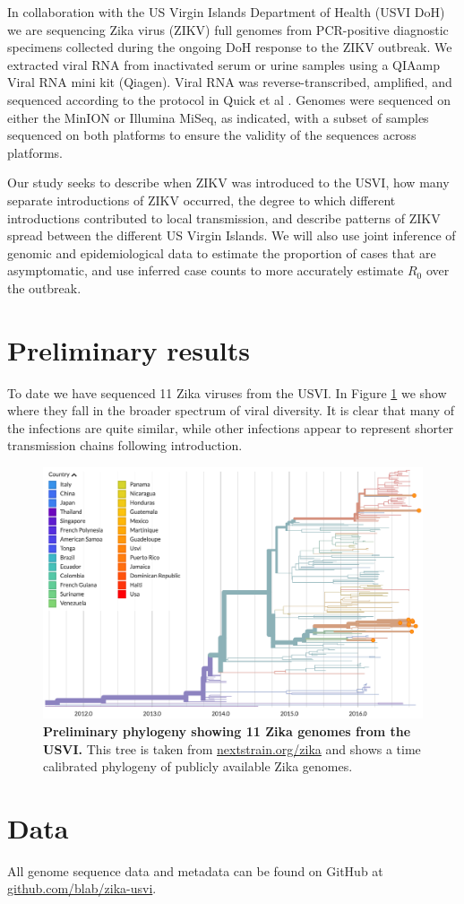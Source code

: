 \documentclass[11pt,oneside,letterpaper]{article}
\begin{document}
In collaboration with the US Virgin Islands Department of Health (USVI DoH) we are sequencing Zika virus (ZIKV) full genomes from PCR-positive diagnostic specimens collected during the ongoing DoH response to the ZIKV outbreak.
We extracted viral RNA from inactivated serum or urine samples using a QIAamp Viral RNA mini kit (Qiagen).
Viral RNA was reverse-transcribed, amplified, and sequenced according to the protocol in Quick et al \cite{quick2017multiplex}.
Genomes were sequenced on either the MinION or Illumina MiSeq, as indicated, with a subset of samples sequenced on both platforms to ensure the validity of the sequences across platforms.

Our study seeks to describe when ZIKV was introduced to the USVI, how many separate introductions of ZIKV occurred, the degree to which different introductions contributed to local transmission, and describe patterns of ZIKV spread between the different US Virgin Islands.
We will also use joint inference of genomic and epidemiological data to estimate the proportion of cases that are asymptomatic, and use inferred case counts to more accurately estimate $R_0$ over the outbreak.

\section*{Preliminary results}

To date we have sequenced 11 Zika viruses from the USVI. In Figure \ref{zika_usvi_tree} we show where they fall in the broader spectrum of viral diversity.
It is clear that many of the infections are quite similar, while other infections appear to represent shorter transmission chains following introduction.

\begin{figure}[H]
	\centering
	\includegraphics[width=1.0\textwidth]{figures/zika_usvi_tree}
	\caption{\textbf{Preliminary phylogeny showing 11 Zika genomes from the USVI.}
	This tree is taken from \href{https://nextstrain.org/zika}{nextstrain.org/zika} and shows a time calibrated phylogeny of publicly available Zika genomes.
	}
	\label{zika_usvi_tree}
\end{figure}

\section*{Data}

All genome sequence data and metadata can be found on GitHub at \href{https://github.com/blab/zika-usvi}{github.com/blab/zika-usvi}.



\end{document}
